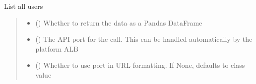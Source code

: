 \documentclass[letterpaper,10pt,english]{sphinxmanual}
\begin{document}
\begin{fulllineitems}
\begin{fulllineitems}
\label{\detokenize{aisquared.platform:aisquared.platform.AISquaredPlatformClient.AISquaredPlatformClient.list_users}}
\pysigstartsignatures
{}
\pysigstopsignatures
\sphinxAtStartPar
List all users

\begin{sphinxVerbatim}[commandchars=\\\{\}]
 
  
\end{sphinxVerbatim}
\begin{quote}\begin{description}
\begin{itemize}
\item {} 
\sphinxAtStartPar
{} (\sphinxstyleliteralemphasis{\sphinxupquote{ (}}\sphinxstyleliteralemphasis{\sphinxupquote{)}}) \textendash{} Whether to return the data as a Pandas DataFrame

\item {} 
\sphinxAtStartPar
{} (\sphinxstyleliteralemphasis{\sphinxupquote{ (}}\sphinxstyleliteralemphasis{\sphinxupquote{)}}) \textendash{} The API port for the call. This can be handled automatically by the platform ALB

\item {} 
\sphinxAtStartPar
{} (\sphinxstyleliteralemphasis{\sphinxupquote{ (}}\sphinxstyleliteralemphasis{\sphinxupquote{)}}) \textendash{} Whether to use port in URL formatting. If None, defaults to class value


\end{itemize}
\end{description}
\end{quote}
\end{fulllineitems}
\end{fulllineitems}
\end{document}
